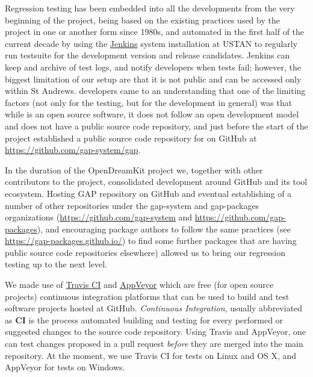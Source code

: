 \documentclass{deliverablereport}
\begin{document}
Regression testing has been embedded into all the \GAP developments
from the very beginning of the project, being based on the existing
practices used by the \GAP project in one or another form since 1980s,
and automated in the first half of the current decade by 
using the \href{https://jenkins.io/}{\sf Jenkins} system installation
at USTAN to regularly run \GAP testsuite for the \GAP development 
version and release candidates.
{\sf Jenkins} can keep and archive of test logs, and notify
developers when tests fail; however, the biggest limitation of our setup are that
it is not public and can be accessed only within St Andrews. 
\GAP developers came to an understanding 
that one of the limiting factors (not only for the testing, but for
the \GAP development in general) was that while \GAP is an open source 
software, it does not follow an open development model and does not
have a public source code repository, and just before the start of
the project established a public source code repository for \GAP
on GitHub at \url{https://github.com/gap-system/gap}. 

In the duration of the OpenDreamKit project we, together with other
contributors to the \GAP project, consolidated \GAP development 
around GitHub and its tool ecosystem.
Hosting GAP repository on GitHub and eventual establishing of a number
of other repositories under the gap-system and gap-packages 
organizations (\url{https://github.com/gap-system} and 
\url{https://github.com/gap-packages}), and encouraging package authors 
to follow the same practices (see \url{https://gap-packages.github.io/})
to find some further packages that are having public source code 
repositories elsewhere) allowed us to bring our regression testing
up to the next level.


We made use of \href{https://travis-ci.org/}{Travis CI} and
\href{https://www.appveyor.com/}{AppVeyor} which are 
free (for open source projects) continuous integration platforms 
that can be used to build and test software projects hosted at GitHub.
\emph{Continuous Integration}, usually abbreviated as {\bf CI} is the process
automated building and testing for every performed or suggested changes to 
the source code repository. Using Travis and AppVeyor, one can test changes proposed
in a pull request \emph{before} they are merged into the main repository.
At the moment, we use Travis CI for tests on Linux and OS X, and 
AppVeyor for tests on Windows.
\end{document}
